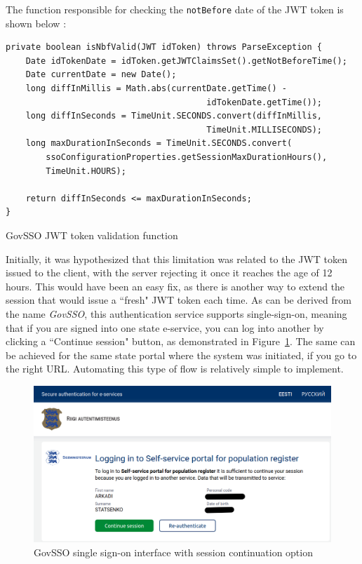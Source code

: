 The function responsible for checking the \texttt{notBefore} date of the JWT token is shown below \cite{govsso-session-hydra}:

\begin{listing}[H]
\begin{verbatim}
private boolean isNbfValid(JWT idToken) throws ParseException {
    Date idTokenDate = idToken.getJWTClaimsSet().getNotBeforeTime();
    Date currentDate = new Date();
    long diffInMillis = Math.abs(currentDate.getTime() -
                                        idTokenDate.getTime());
    long diffInSeconds = TimeUnit.SECONDS.convert(diffInMillis, 
                                        TimeUnit.MILLISECONDS);
    long maxDurationInSeconds = TimeUnit.SECONDS.convert(
        ssoConfigurationProperties.getSessionMaxDurationHours(), 
        TimeUnit.HOURS);

    return diffInSeconds <= maxDurationInSeconds;
}
\end{verbatim}
\caption{GovSSO JWT token validation function}
\label{lst:govsso-jwt-validation}
\end{listing}

Initially, it was hypothesized that this limitation was related to the JWT token issued to the client, with the server rejecting it once it reaches the age of 12 hours. This would have been an easy fix, as there is another way to extend the session that would issue a ``fresh" JWT token each time. As can be derived from the name \textit{GovSSO}, this authentication service supports single-sign-on, meaning that if you are signed into one state e-service, you can log into another by clicking a ``Continue session" button, as demonstrated in Figure~\ref{fig:eesti-ee-continue-session}. The same can be achieved for the same state portal where the system was initiated, if you go to the right URL. Automating this type of flow is relatively simple to implement.

\begin{figure}[H]
\centering
\includegraphics[width=450px]{english/figures/Screenshot from 2025-08-08 20-37-42.png}
\caption{GovSSO single sign-on interface with session continuation option\cite{eesti-ee-screenshot}}
\label{fig:eesti-ee-continue-session}
\end{figure}

